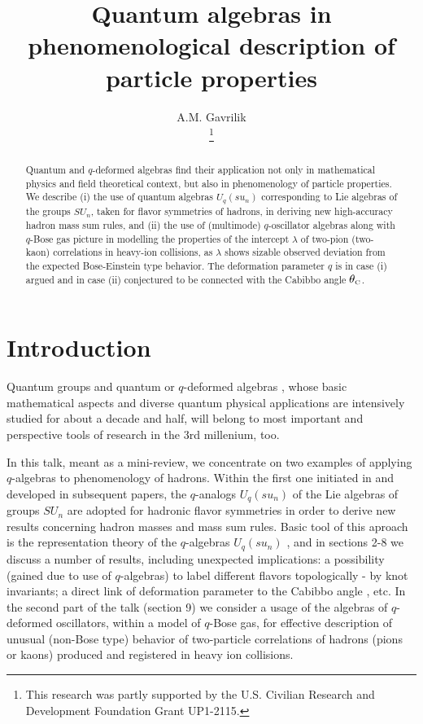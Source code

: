 \documentclass[twoside]{article}
\title{Quantum algebras in phenomenological description
                        of particle properties}
\author{A.M. Gavrilik\address[MCSD]{Bogolyubov
        Institute for Theoretical Physics, \\
        03143, Kiev, Ukraine}
        \thanks{%
                This research was partly supported by the U.S.
                Civilian Research and Development Foundation
                Grant UP1-2115.
                      }}
\newcommand{\scr}{\rm\scriptscriptstyle}
\begin{document}
\begin{abstract}
Quantum and $q$-deformed algebras find their application not only in
mathematical physics and field theoretical context, but also in
phenomenology of particle properties.  We describe  (i) the use of
quantum algebras $U_q(su_n)$ corresponding to Lie algebras of
the groups $SU_n$, taken for flavor symmetries of hadrons,
in deriving new high-accuracy hadron mass sum rules, and  (ii) the
use of (multimode) $q$-oscillator algebras along with $q$-Bose gas
picture in modelling the properties of the intercept $\lambda$ of
two-pion (two-kaon) correlations in heavy-ion collisions,
as $\lambda$ shows sizable observed deviation from the expected
Bose-Einstein type behavior. The deformation parameter $q$ is
in case (i) argued and in case (ii) conjectured to be connected
with the Cabibbo angle $\theta_{\scr{C}}$.

\vspace{1pc}
\end{abstract}

\maketitle



\section{Introduction}

Quantum groups and quantum or $q$-deformed
algebras   \cite{dr-j,frt}, whose basic mathematical aspects and
diverse quantum physical applications are intensively studied
for about a decade and half, will belong to most important
and perspective tools of research in the 3rd millenium, too.

In this talk, meant as a mini-review, we concentrate on two examples
of applying $q$-algebras to phenomenology of hadrons.  Within the
first one initiated in   \cite{ga-ser} and developed in subsequent
papers, the $q$-analogs $U_q(su_n)$ of the Lie algebras of groups
$SU_n$ are adopted for hadronic flavor symmetries in order to derive
new results concerning hadron masses and mass sum rules. Basic tool of
this aproach is the representation theory of the $q$-algebras
$U_q(su_n)$  \cite{dr-j,frt}, and in sections 2-8 we discuss a number
of results, including unexpected implications: a possibility (gained due
to use of $q$-algebras) to label different flavors topologically -
by knot invariants;  a direct link of deformation parameter
to the Cabibbo angle   \cite{cabi}, etc.
   In the second part of the talk (section 9) we consider a
usage of the algebras of $q$-deformed oscillators,
within a model of $q$-Bose gas, for effective
description of unusual (non-Bose type) behavior of
two-particle correlations of hadrons (pions or kaons) produced
and registered in heavy ion collisions.
\end{document}
